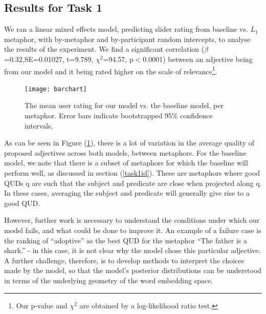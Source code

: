 \documentclass[10pt,letterpaper,twocolumn]{article}
\begin{document}
\subsection{Results for Task 1}


We ran a linear mixed effects model, predicting slider rating from baseline vs. $L_1$ metaphor, with by-metaphor and by-participant random intercepts, to analyse the results of the experiment. We find a significant correlation ($\beta$=0.32,SE=0.01027, t=9.789, $\chi^2$=94.57, p$<$0.0001) between an adjective being from our model and it being rated higher on the scale of relevance\footnote{Our p-value and $\chi^2$ are obtained by a log-likelihood ratio test.}.


\begin{figure} 
\centerline{\texttt{[image: barchart]}}
\caption{The mean user rating for our model vs. the baseline model, per metaphor. Error bars indicate bootstrapped 95\% confidence intervals.} \label{resultsbar}
\end{figure}

As can be seen in Figure (\ref{resultsbar}), there is a lot of variation in the average quality of proposed adjectives across both models, between metaphors. For the baseline model, we note that there is a subset of metaphors for which the baseline will perform well, as discussed in section (\ref{task1id}). These are metaphors where good QUDs q are such that the subject and predicate are close when projected along q. In these cases, averaging the subject and predicate will generally give rise to a good QUD. 

However, further work is necessary to understand the conditions under which our model fails, and what could be done to improve it. An example of a failure case is the ranking of ``adoptive'' as the best QUD for the metaphor ``The father is a shark.'' - in this case, it is not clear why the model chose this particular adjective. A further challenge, therefore, is to develop methods to interpret the choices made by the model, so that the model's posterior distributions can be understood in terms of the underlying geometry of the word embedding space.



\end{document}
